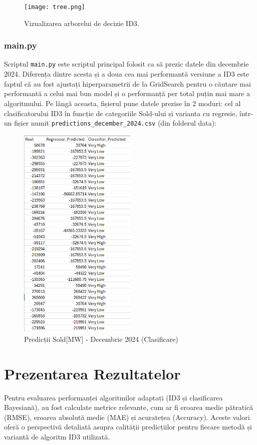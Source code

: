 \documentclass[a4paper,12pt]{article}
\begin{document}
\begin{figure}[ht!]
    \centering
    \texttt{[image: tree.png]}
    \caption{Vizualizarea arborelui de decizie ID3.}
\end{figure}

\subsubsection{main.py}
Scriptul \texttt{main.py} este scriptul principal folosit ca să prezic datele din decembrie 2024. Diferența dintre acesta și a doua cea mai performantă versiune a ID3 este faptul că au fost ajustați hiperparametrii de la GridSearch pentru o căutare mai performantă a celui mai bun model și o performanță per total puțin mai mare a algoritmului. Pe lângă aceasta, fișierul pune datele prezise în 2 moduri: cel al clasificatorului ID3 în funcție de categoriile Sold-ului și varianta cu regresie, într-un fișier numit \texttt{predictions\_december\_2024.csv} (din folderul data):

\begin{figure}
    \centering
    \includegraphics[width=0.5\textwidth]{img3.png}
    \caption{Predicții Sold[MW] - Decembrie 2024 (Clasificare)}
    \label{fig:predictii2024_clasificare}
\end{figure}

\section{Prezentarea Rezultatelor}
Pentru evaluarea performanței algoritmilor adaptați (ID3 și clasificarea Bayesiană), au fost calculate metrice relevante, cum ar fi eroarea medie pătratică (RMSE), eroarea absolută medie (MAE) și acuratețea (Accuracy). Aceste valori oferă o perspectivă detaliată asupra calității predicțiilor pentru fiecare metodă și variantă de algoritm ID3 utilizată.
\end{document}
